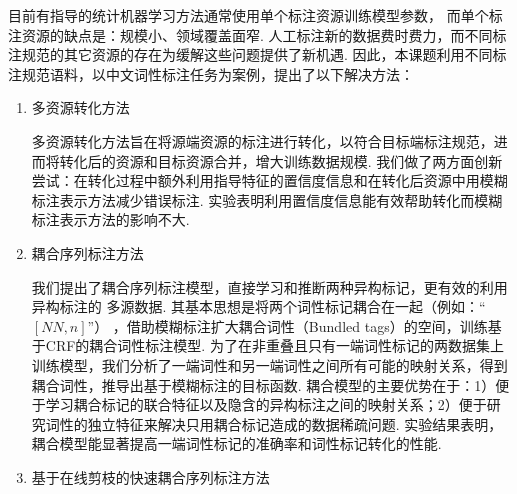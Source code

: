 
\begin{cabstract}


    目前有指导的统计机器学习方法通常使用单个标注资源训练模型参数，
    而单个标注资源的缺点是：规模小、领域覆盖面窄.
    人工标注新的数据费时费力，而不同标注规范的其它资源的存在为缓解这些问题提供了新机遇. 因此，本课题利用不同标注规范语料，以中文词性标注任务为案例，提出了以下解决方法：
    \begin{enumerate}
        \item 多资源转化方法

              多资源转化方法旨在将源端资源的标注进行转化，以符合目标端标注规范，进而将转化后的资源和目标资源合并，增大训练数据规模.
              我们做了两方面创新尝试：在转化过程中额外利用指导特征的置信度信息和在转化后资源中用模糊标注表示方法减少错误标注. 实验表明利用置信度信息能有效帮助转化而模糊标注表示方法的影响不大.

        \item 耦合序列标注方法

              我们提出了耦合序列标注模型，直接学习和推断两种异构标记，更有效的利用异构标注的 多源数据. 其基本思想是将两个词性标记耦合在一起（例如：``$[NN,n]$''） ，借助模糊标注扩大耦合词性（Bundled tags）的空间，训练基于CRF的耦合词性标注模型. 为了在非重叠且只有一端词性标记的两数据集上训练模型，我们分析了一端词性和另一端词性之间所有可能的映射关系，得到耦合词性，推导出基于模糊标注的目标函数. 耦合模型的主要优势在于：1）便于学习耦合标记的联合特征以及隐含的异构标注之间的映射关系；2）便于研究词性的独立特征来解决只用耦合标记造成的数据稀疏问题. 实验结果表明，耦合模型能显著提高一端词性标记的准确率和词性标记转化的性能.

        \item 基于在线剪枝的快速耦合序列标注方法


\end{enumerate}
\end{cabstract}
